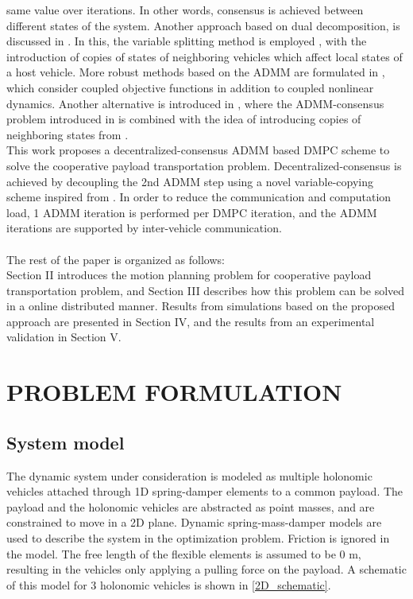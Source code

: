 \documentclass[letterpaper, 10 pt, conference]{ieeeconf}
\begin{document}
 same value over iterations. In other words, consensus is achieved between different states of the system. Another approach based on dual decomposition, is discussed in \cite{c11}. In this, the variable splitting method is employed \cite{c8}, with the introduction of copies of states of neighboring vehicles which affect local states of a host vehicle. More robust methods based on the ADMM are formulated in \cite{c12}, which consider coupled objective functions in addition to coupled nonlinear dynamics. Another alternative is introduced in \cite{c13}, where the
 ADMM-consensus problem introduced in \cite{c14} is combined with the idea of introducing copies of neighboring states from \cite{c11}.
 \\
 \indent
 This work proposes a decentralized-consensus ADMM based DMPC scheme to solve the cooperative payload transportation problem. Decentralized-consensus is achieved by decoupling the 2nd ADMM step using a novel variable-copying scheme inspired from \cite{c9}. In order to reduce the communication and computation load, 1 ADMM iteration is performed per DMPC iteration, and the ADMM iterations are supported by inter-vehicle communication.
 \\ \\ \indent
 The rest of the paper is organized as follows: \\
Section  II  introduces  the  motion  planning  problem  for
cooperative payload transportation problem, and Section III describes how
this  problem  can  be  solved  in  a  online distributed manner. Results from simulations based on the proposed approach are presented in Section IV, and the results from an experimental validation in Section V.
\section{PROBLEM FORMULATION}
\subsection{System model}
The dynamic system under consideration is modeled as multiple holonomic vehicles attached through 1D spring-damper elements to a common payload. The payload and the holonomic vehicles are abstracted as point masses, and are constrained to move in a 2D plane. Dynamic spring-mass-damper models are used to describe the system in the optimization problem. Friction is ignored in the model. The free length of the flexible elements is assumed to be $0$ m, resulting in the vehicles only applying a pulling force on the payload. A schematic of this model for 3 holonomic vehicles is shown in \ref{2D_schematic}.
\end{document}
